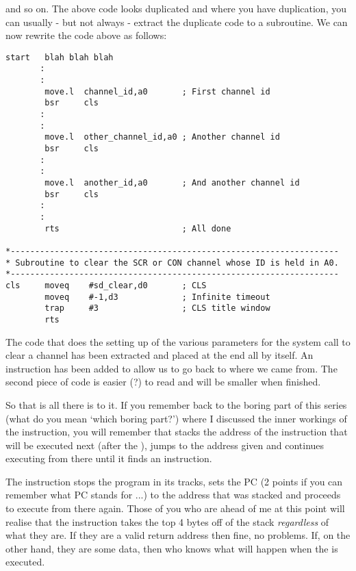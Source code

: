 and so on. The above code looks duplicated and where you have
    duplication, you can usually -{} but not always -{} extract the duplicate code
    to a subroutine. We can now rewrite the code above as follows:

\begin{lstlisting}[firstnumber=1,caption={Example of Non-repetitive Code},label={lst:ExampleOfNonRepetetiveCode}]
start   blah blah blah
       :
       :
        move.l  channel_id,a0       ; First channel id
        bsr     cls
       :
       :
        move.l  other_channel_id,a0 ; Another channel id
        bsr     cls
       :
       :
        move.l  another_id,a0       ; And another channel id
        bsr     cls
       :
       :
        rts                         ; All done

*-------------------------------------------------------------------
* Subroutine to clear the SCR or CON channel whose ID is held in A0.
*-------------------------------------------------------------------
cls     moveq    #sd_clear,d0       ; CLS
        moveq    #-1,d3             ; Infinite timeout
        trap     #3                 ; CLS title window
        rts
\end{lstlisting}

The code that does the setting up of the various parameters for the
    system call to clear a channel has been extracted and placed at the end
    all by itself. An  instruction has been added to allow us to go back to
    where we came from. The second piece of code is easier (?) to read and
    will be smaller when finished.

So that is all there is to it. If you remember back to the boring
    part of this series (what do you mean `which boring part?') where I
    discussed the inner workings of the  instruction, you will remember
    that  stacks the address of the instruction that will be executed next
    (after the ), jumps to the address given and continues executing from
    there until it finds an  instruction.

The  instruction stops the program in its tracks, sets the PC (2
    points if you can remember what PC stands for ...) to the address that was
    stacked and proceeds to execute from there again. Those of you who are
    ahead of me at this point will realise that the  instruction takes the
    top 4 bytes off of the stack \emph{regardless} of what they are. If they are a
    valid return address then fine, no problems. If, on the other hand, they
    are some data, then who knows what will happen when the  is
    executed.

